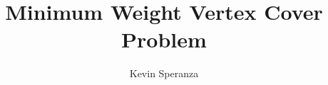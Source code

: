 \documentclass[12pt,a4paper,openany,oneside]{book}
\begin{document}


\title{Minimum Weight Vertex Cover Problem}
\author{Kevin Speranza}

\tableofcontents






\newpage
{}
\end{document}
